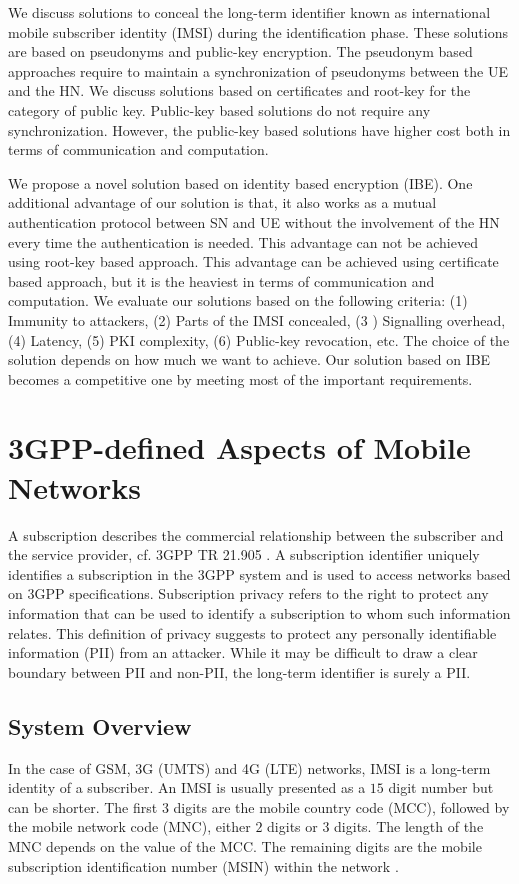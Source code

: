 \documentclass{river-journal}
\begin{document}
We discuss solutions to conceal the long-term identifier known as international mobile subscriber identity (IMSI) during the identification phase. These solutions are based on pseudonyms and public-key encryption. The pseudonym based approaches require to maintain a synchronization of pseudonyms between the UE and the HN. We discuss solutions based on certificates and root-key for the category of public key. Public-key based solutions do not require any synchronization. However, the public-key based solutions have higher cost both in terms of communication and computation. 

We propose a novel solution based on identity based encryption (IBE). One additional advantage of our solution is that, it also works as a mutual authentication protocol between SN and UE without the involvement of the HN every time the authentication is needed. This advantage can not be achieved using root-key based approach. This advantage can be achieved using certificate based approach, but it is the heaviest in terms of communication and computation. 
We evaluate our solutions based on the following criteria: (1) Immunity to attackers, (2) Parts of the IMSI concealed, (3 ) Signalling overhead, (4) Latency, (5) PKI complexity, (6) Public-key revocation, etc. The choice of the solution depends on how much we want to achieve. Our solution based on IBE becomes a competitive one by meeting most of the important requirements.

\section{3GPP-defined Aspects of Mobile Networks}
\label{sec:3GPP-defined_aspects_of_mobile_network}
A subscription describes the commercial relationship between the subscriber and the service provider, cf. 3GPP TR 21.905 \cite{TR21905}. A subscription identifier uniquely identifies a subscription in the 3GPP system and is used to access networks based on 3GPP specifications. Subscription privacy refers to the right to protect any information that can be used to identify a subscription to whom such information relates. This definition of privacy suggests to protect any personally identifiable information (PII) from an attacker. While it may be difficult to draw a clear boundary between PII and non-PII, the long-term identifier is surely a PII. 

\subsection{System Overview}
In the case of GSM, 3G (UMTS) and 4G (LTE) networks, IMSI is a long-term identity of a subscriber. An IMSI is usually presented as a $15$ digit number but can be shorter. The first $3$ digits are the mobile country code (MCC), followed by the mobile network code (MNC), either $2$ digits or $3$ digits. The length of the MNC depends on the value of the MCC. The remaining digits are the mobile subscription identification number (MSIN) within the network \cite{TS23003}. 
\end{document}
